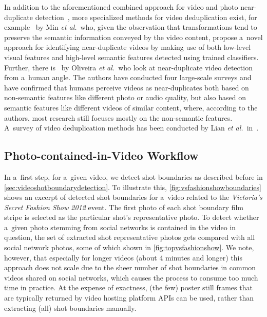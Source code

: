 In addition to the aforementioned  combined approach
for video and photo near-duplicate
detection~\cite{yang2009nearduplicate},
more specialized methods for video deduplication exist,
for example~\cite{min2011nearduplicatevideo,wu2009nearduplicate}
by Min \emph{et al.}\ who, given the observation that 
transformations tend to preserve the semantic information conveyed
by the video content, propose a~novel approach for identifying
near-duplicate videos by making use of both low-level visual
features and high-level semantic features
detected using trained classifiers.
Further, there is~\cite{oliveira2010nearduplicate} by Oliveira
\emph{et al.}\ who look at near-duplicate video detection
from a~human angle.  
The authors have conducted four large-scale surveys
and have confirmed that humans perceive videos as near-duplicates
both based on non-semantic features like different photo or audio
quality, but also based on semantic features like different
videos of similar content, where, according to the authors,
most research still focuses mostly on the non-semantic features.
A~survey of video deduplication methods has been conducted by
Lian \emph{et al.}\ in~\cite{lian2010survey}.

\subsection{Photo-contained-in-Video Workflow}

In a~first step, for a~given video, we detect shot boundaries
as described before in \autoref{sec:videoshotboundarydetection}.
To illustrate this,
\autoref{fig:vsfashionshowboundaries} shows an excerpt
of detected shot boundaries for a~video related to
the \emph{Victoria's Secret Fashion Show 2012} event.
The first photo of each shot boundary film stripe
is selected as the particular shot's representative photo.
To detect whether a~given photo stemming from social networks
is contained in the video in question,
the set of extracted shot representative photos gets compared
with all social network photos,
some of which shown in \autoref{fig:topvsfashionshow}.
We note, however, that especially for longer videos
(about 4 minutes and longer)
this approach does not scale due to the sheer number of shot boundaries
in common videos shared on social networks,
which causes the process to consume too much time in practice.
At the expense of exactness, (the few) poster still frames
that are typically returned by video hosting platform APIs
can be used, rather than extracting (all) shot boundaries manually.

